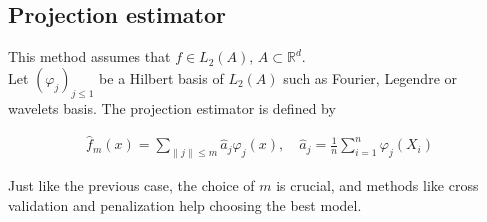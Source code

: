\documentclass{article}
\begin{document}
\subsection{Projection estimator}
This method assumes that \(f\in L_2(A), \, A\subset \mathbb{R}^d\). \\
Let \((\varphi_j)_{j\le 1}\) be a Hilbert basis of \(L_2(A)\) such as Fourier, Legendre or wavelets basis. The projection estimator is defined by 

\begin{align}
    \hat{f}_m(x)=\sum_{\|j\|\le m} \hat{a}_j\varphi_j(x), \quad \hat{a}_j=\frac{1}{n}\sum_{i=1}^n \varphi_j(X_i)
\end{align}

\begin{comment}
\begin{align}
    \hat{f}_\mathrm{K}=\sum_{k_1=1}^{K_1}\ldots\sum_{k_d=1}^{K_d}\hat{a}_{k_1,\ldots,k_d}\varphi_{k_1,\ldots,k_d}, \quad \hat{a}_{k_1,\ldots,k_d}=\frac{1}{n}\sum_{i=1}^n \varphi_{k_1,\ldots,k_d}(X_i) = \frac{1}{n}\sum_{i=1}^n \prod_{j=1}^d \varphi_{k_j}(X_i)
\end{align}
\end{comment}
Just like the previous case, the choice of \(m\) is crucial, and methods like cross validation and penalization help choosing the best model.

\bigskip



\nocite{Coste_2025}
\nocite{lipman2024flowmatchingguidecode}
\nocite{strasman2025analysisnoiseschedulescorebased}
\nocite{battey2014smoothprojecteddensityestimation}
\nocite{dionblanc2025nonparametricdensityestimation}
\nocite{mathieu2024flow}
\nocite{VisualDive_2025}


\end{document}
